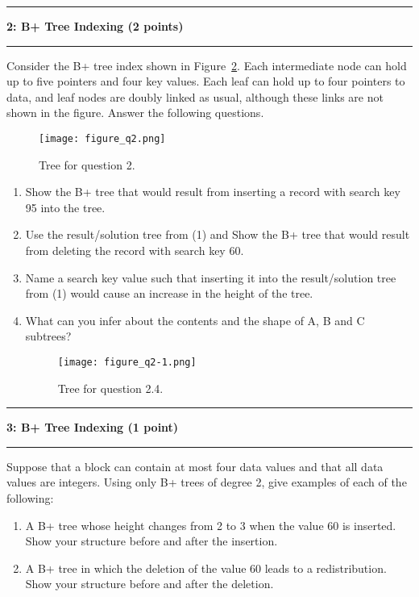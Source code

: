 \documentclass[11pt]{article}
\newcommand\question[2]{\vspace{.25in}\hrule\textbf{#1: #2}\vspace{.5em}\hrule\vspace{.10in}}
\begin{document}
\question{2}{B+ Tree Indexing (2 points)}
Consider the B+ tree index shown in Figure~\ref{figure:q2}. 
Each intermediate node can hold up to five pointers and four key values. Each leaf can hold up to four pointers to data, and leaf nodes are doubly linked as usual, although these links are not shown in the figure.
Answer the following questions.

\begin{figure}[h]
	\centering
	\texttt{[image: figure\_q2.png]}
	\caption{Tree for question 2.}
	\label{figure:q2}
\end{figure}

\begin{comment}
{"keys": [25,55,75],
 "children": [{"keys": [5,10,15,20]}, {"keys": [25,28,30,50]}, {"keys": [55,60,65,70]}, {"keys": [75,80,85,90]}]
}
\end{comment}

\begin{enumerate}
	\item Show the B+ tree that would result from inserting a record with search key 95 into the tree.
	

	\item Use the result/solution tree from (1) and Show the B+ tree that would result from deleting the record with search key 60.
	

	\item Name a search key value such that inserting it into the result/solution tree from (1) would cause an increase in the height of the tree.
	

	\item What can you infer about the contents and the shape of A, B and C subtrees?
	
	\begin{figure}[h]
	\centering
	\texttt{[image: figure\_q2-1.png]}
	\caption{Tree for question 2.4.}
	\label{figure:q2}
    \end{figure}


\end{enumerate}




\question{3}{B+ Tree Indexing (1 point)}
Suppose that a block can contain at most four data values and that all data values are integers. Using only B+ trees of degree 2, give examples of each of the following:
\begin{enumerate}
	\item A B+ tree whose height changes from 2 to 3 when the value 60 is inserted. Show your structure before and after the insertion.
	

	
	\item A B+ tree in which the deletion of the value 60 leads to a redistribution. Show your structure before and after the deletion.
	

\end{enumerate}
\end{document}
